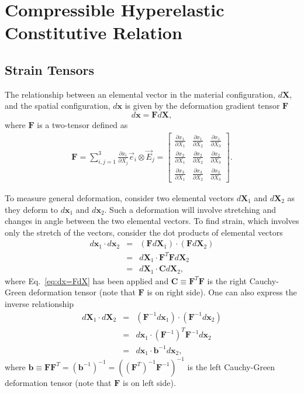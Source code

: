 \chapter{Compressible Hyperelastic Constitutive Relation}

\section{Strain Tensors}

The relationship between an elemental vector in the material configuration, $d\pmb{X}$, and the spatial configuration, $d\pmb{x}$ is given by the deformation gradient tensor $\pmb{F}$
%
\begin{equation}
d\pmb{x} = \pmb{F}d\pmb{X},
\label{eq:dx=FdX}
\end{equation}
%
where $\pmb{F}$ is a two-tensor defined as
%
\begin{eqnarray}
\pmb{F} = \sum_{i,j=1}^3 \frac{\partial x_i}{\partial X_j} \vec{e}_i \otimes \vec{E}_j =
%
\begin{bmatrix}
\frac{\partial x_1}{\partial X_1} & \frac{\partial x_1}{\partial X_2} & \frac{\partial x_1}{\partial X_3} \\
\frac{\partial x_2}{\partial X_1} & \frac{\partial x_2}{\partial X_2} & \frac{\partial x_2}{\partial X_3} \\
\frac{\partial x_3}{\partial X_1} & \frac{\partial x_3}{\partial X_2} & \frac{\partial x_3}{\partial X_3} 
\end{bmatrix}.
\label{eq:deformation-gradient}
\end{eqnarray}
%

To measure general deformation, consider two elemental vectors $d\pmb{X}_1$ and $d\pmb{X}_2$ as they deform to $d\pmb{x}_1$ and $d\pmb{x}_2$. Such a deformation will involve stretching and changes in angle between the two elemental vectors. To find strain, which involves only the stretch of the vectors, consider the dot products of elemental vectors
%
\begin{eqnarray}
d\pmb{x}_1 \cdot d\pmb{x}_2 &=& (\pmb{F} d\pmb{X}_1) \cdot (\pmb{F}d\pmb{X}_2) \nonumber\\
%
&=& d\pmb{X}_1 \cdot \pmb{F}^T\pmb{F} d\pmb{X}_2 \nonumber\\
&=& d\pmb{X}_1 \cdot \pmb{C} d\pmb{X}_2,
\end{eqnarray}
%
where Eq.\ \eqref{eq:dx=FdX} has been applied and $\pmb{C} \equiv \pmb{F}^T \pmb{F}$ is the right Cauchy-Green deformation tensor (note that $\pmb{F}$ is on right side). One can also express the inverse relationship
%
\begin{eqnarray}
d\pmb{X}_1 \cdot d\pmb{X}_2 &=& (\pmb{F}^{-1}d\pmb{x}_1) \cdot (\pmb{F}^{-1} d\pmb{x}_2) \nonumber\\
&=& d\pmb{x}_1 \cdot (\pmb{F}^{-1})^T\pmb{F}^{-1} d\pmb{x}_2 \nonumber\\
&=& d\pmb{x}_1 \cdot \pmb{b}^{-1} d\pmb{x}_2,
\end{eqnarray}
%
where $\pmb{b} \equiv \pmb{F}\pmb{F}^T = (\pmb{b}^{-1})^{-1} = ((\pmb{F}^T)^{-1} \pmb{F}^{-1})^{-1}$ is the left Cauchy-Green deformation tensor (note that $\pmb{F}$ is on left side).

